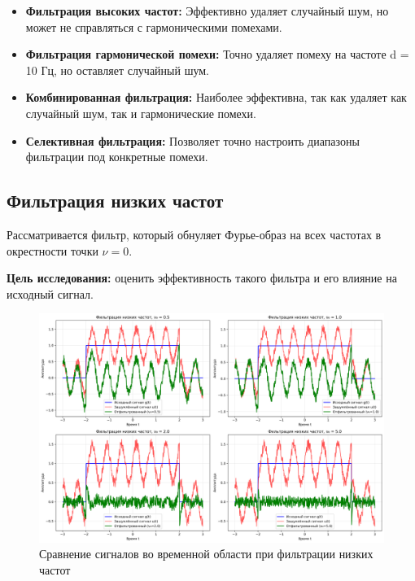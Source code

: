 \begin{itemize}
    \item \textbf{Фильтрация высоких частот:} Эффективно удаляет случайный шум, но может не справляться с гармоническими помехами.
    
    \item \textbf{Фильтрация гармонической помехи:} Точно удаляет помеху на частоте d = 10 Гц, но оставляет случайный шум.
    
    \item \textbf{Комбинированная фильтрация:} Наиболее эффективна, так как удаляет как случайный шум, так и гармонические помехи.
    
    \item \textbf{Селективная фильтрация:} Позволяет точно настроить диапазоны фильтрации под конкретные помехи.
\end{itemize}

\subsection*{Фильтрация низких частот}

Рассматривается фильтр, который обнуляет Фурье-образ на всех частотах в окрестности точки $\nu = 0$.

\textbf{Цель исследования:} оценить эффективность такого фильтра и его влияние на исходный сигнал.

\begin{figure}[H]
\centering
\includegraphics[width=\textwidth]{images/task1/low_freq_filter_time_domain.png}
\caption{Сравнение сигналов во временной области при фильтрации низких частот}
\end{figure}

